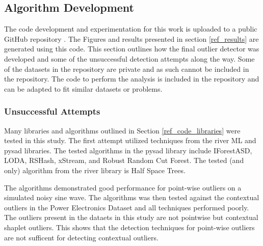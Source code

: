\subsection{Algorithm Development}

The code development and experimentation for this work is uploaded to a public GitHub repository \parencite{BeattieGithub2022}. The Figures and results presented in section \ref{ref_results} are generated using this code. This section outlines how the final outlier detector was developed and some of the unsuccessful detection attempts along the way. Some of the datasets in the repository are private and as such cannot be included in the repository. The code to perform the analysis is included in the repository and can be adapted to fit similar datasets or problems.

\subsubsection{Unsuccessful Attempts}

Many libraries and algorithms outlined in Section \ref{ref_code_libraries} were tested in this study. The first attempt utilized techniques from the river ML \parencite{2020river} and pysad \parencite{pysad} libraries. The tested algorithms in the pysad library include IForestASD, LODA, RSHash, xStream, and Robust Random Cut Forest. The tested (and only) algorithm from the river library is Half Space Trees.

The algorithms demonstrated good performance for point-wise outliers on a simulated noisy sine wave. The algorithms was then tested against the contextual outliers in the Power Electronics Dataset and all techniques performed poorly. The outliers present in the dataets in this study are not pointwise but contextual shaplet outliers.
This shows that the detection techniques for point-wise outliers are not sufficent for detecting contextual outliers.

